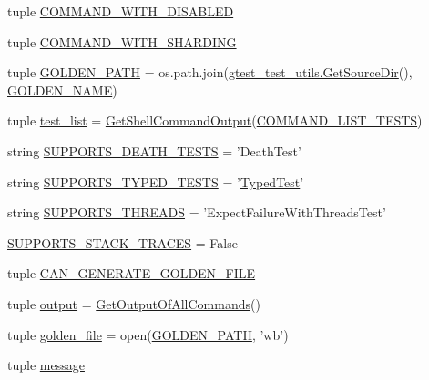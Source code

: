 \begin{DoxyCompactItemize}
\item 
tuple \hyperlink{namespacegtest__output__test_a70171070f430e6b01d6b6504d47c9f35}{\-C\-O\-M\-M\-A\-N\-D\-\_\-\-W\-I\-T\-H\-\_\-\-D\-I\-S\-A\-B\-L\-E\-D}
\item 
tuple \hyperlink{namespacegtest__output__test_a8ddeaaccb2cba2976ca37b95ffc4e6f3}{\-C\-O\-M\-M\-A\-N\-D\-\_\-\-W\-I\-T\-H\-\_\-\-S\-H\-A\-R\-D\-I\-N\-G}
\item 
tuple \hyperlink{namespacegtest__output__test_aac7d32261d969f8beb576a4612f08312}{\-G\-O\-L\-D\-E\-N\-\_\-\-P\-A\-T\-H} = os.\-path.\-join(\hyperlink{namespacegtest__test__utils_a61bdad46f079ed13d9102f8a8c13ea18}{gtest\-\_\-test\-\_\-utils.\-Get\-Source\-Dir}(), \hyperlink{namespacegtest__output__test_ad363abe54f765870f1e0b636207cf8c6}{\-G\-O\-L\-D\-E\-N\-\_\-\-N\-A\-M\-E})
\item 
tuple \hyperlink{namespacegtest__output__test_a7f9b464ccfd6a25be5d881c09fad1bf0}{test\-\_\-list} = \hyperlink{namespacegtest__output__test_a52d428b680879fbe96182f7db8ae738e}{\-Get\-Shell\-Command\-Output}(\hyperlink{namespacegtest__output__test_aa70dd51efa7d58dfb1b670c3218127ba}{\-C\-O\-M\-M\-A\-N\-D\-\_\-\-L\-I\-S\-T\-\_\-\-T\-E\-S\-T\-S})
\item 
string \hyperlink{namespacegtest__output__test_ab164861804ce21115e617dfbe5788ad4}{\-S\-U\-P\-P\-O\-R\-T\-S\-\_\-\-D\-E\-A\-T\-H\-\_\-\-T\-E\-S\-T\-S} = '\-Death\-Test'
\item 
string \hyperlink{namespacegtest__output__test_a6afa6549700ee5662a4c4b358ea34efa}{\-S\-U\-P\-P\-O\-R\-T\-S\-\_\-\-T\-Y\-P\-E\-D\-\_\-\-T\-E\-S\-T\-S} = '\hyperlink{classTypedTest}{\-Typed\-Test}'
\item 
string \hyperlink{namespacegtest__output__test_af0e2dced91526579b1c2d6998de45ba8}{\-S\-U\-P\-P\-O\-R\-T\-S\-\_\-\-T\-H\-R\-E\-A\-D\-S} = '\-Expect\-Failure\-With\-Threads\-Test'
\item 
\hyperlink{namespacegtest__output__test_ab8494653f66ef3793c6d966c3d982ffb}{\-S\-U\-P\-P\-O\-R\-T\-S\-\_\-\-S\-T\-A\-C\-K\-\_\-\-T\-R\-A\-C\-E\-S} = \-False
\item 
tuple \hyperlink{namespacegtest__output__test_afc7345f27a2b1726ffc7cb648124e816}{\-C\-A\-N\-\_\-\-G\-E\-N\-E\-R\-A\-T\-E\-\_\-\-G\-O\-L\-D\-E\-N\-\_\-\-F\-I\-L\-E}
\item 
tuple \hyperlink{namespacegtest__output__test_acf316e258896197f4e917a6547e49532}{output} = \hyperlink{namespacegtest__output__test_a9d3e73851ab6b1d226fc584036025839}{\-Get\-Output\-Of\-All\-Commands}()
\item 
tuple \hyperlink{namespacegtest__output__test_ad964337c62007915e9fdd0c445cc9a2a}{golden\-\_\-file} = open(\hyperlink{namespacegtest__output__test_aac7d32261d969f8beb576a4612f08312}{\-G\-O\-L\-D\-E\-N\-\_\-\-P\-A\-T\-H}, 'wb')
\item 
tuple \hyperlink{namespacegtest__output__test_a536593b2a92b75b5c370d337feb4f615}{message}
\end{DoxyCompactItemize}


